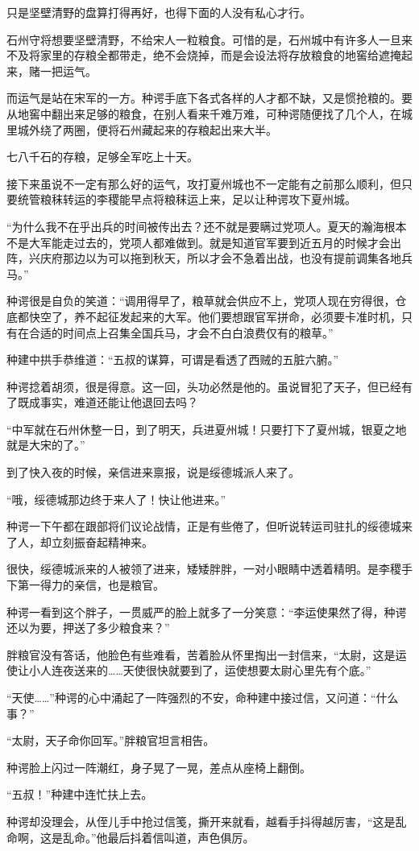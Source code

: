 只是坚壁清野的盘算打得再好，也得下面的人没有私心才行。

石州守将想要坚壁清野，不给宋人一粒粮食。可惜的是，石州城中有许多人一旦来不及将家里的存粮全都带走，绝不会烧掉，而是会设法将存放粮食的地窖给遮掩起来，赌一把运气。

而运气是站在宋军的一方。种谔手底下各式各样的人才都不缺，又是惯抢粮的。要从地窖中翻出来足够的粮食，在别人看来千难万难，可种谔随便找了几个人，在城里城外绕了两圈，便将石州藏起来的存粮起出来大半。

七八千石的存粮，足够全军吃上十天。

接下来虽说不一定有那么好的运气，攻打夏州城也不一定能有之前那么顺利，但只要统管粮秣转运的李稷能早点将粮秣运上来，足以让种谔攻下夏州城。

“为什么我不在乎出兵的时间被传出去？还不就是要瞒过党项人。夏天的瀚海根本不是大军能走过去的，党项人都难做到。就是知道官军要到近五月的时候才会出阵，兴庆府那边以为可以拖到秋天，所以才会不急着出战，也没有提前调集各地兵马。”

种谔很是自负的笑道：“调用得早了，粮草就会供应不上，党项人现在穷得很，仓底都快空了，养不起征发起来的大军。他们要想跟官军拼命，必须要卡准时机，只有在合适的时间点上召集全国兵马，才会不白白浪费仅有的粮草。”

种建中拱手恭维道：“五叔的谋算，可谓是看透了西贼的五脏六腑。”

种谔捻着胡须，很是得意。这一回，头功必然是他的。虽说冒犯了天子，但已经有了既成事实，难道还能让他退回去吗？

“中军就在石州休整一日，到了明天，兵进夏州城！只要打下了夏州城，银夏之地就是大宋的了。”

到了快入夜的时候，亲信进来禀报，说是绥德城派人来了。

“哦，绥德城那边终于来人了！快让他进来。”

种谔一下午都在跟部将们议论战情，正是有些倦了，但听说转运司驻扎的绥德城来了人，却立刻振奋起精神来。

很快，绥德城派来的人被领了进来，矮矮胖胖，一对小眼睛中透着精明。是李稷手下第一得力的亲信，也是粮官。

种谔一看到这个胖子，一贯威严的脸上就多了一分笑意：“李运使果然了得，种谔还以为要，押送了多少粮食来？”

胖粮官没有答话，他脸色有些难看，苦着脸从怀里掏出一封信来，“太尉，这是运使让小人连夜送来的……天使很快就要到了，运使想要太尉心里先有个底。”

“天使……”种谔的心中涌起了一阵强烈的不安，命种建中接过信，又问道：“什么事？”

“太尉，天子命你回军。”胖粮官坦言相告。

种谔脸上闪过一阵潮红，身子晃了一晃，差点从座椅上翻倒。

“五叔！”种建中连忙扶上去。

种谔却没理会，从侄儿手中抢过信笺，撕开来就看，越看手抖得越厉害，“这是乱命啊，这是乱命。”他最后抖着信叫道，声色俱厉。

